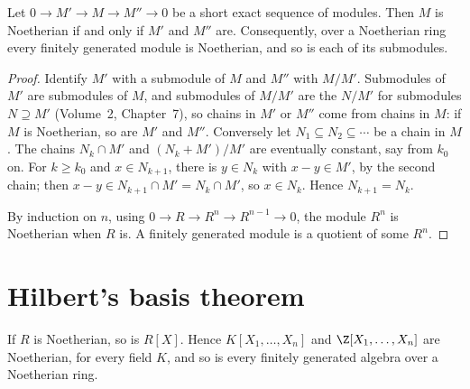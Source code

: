 \begin{proposition}\label{prop:noethmodules}
Let $0\to M'\to M\to M''\to0$ be a short exact sequence of modules. Then $M$ is Noetherian if and only if $M'$ and $M''$ are. Consequently, over a Noetherian ring every finitely generated module is
Noetherian, and so is each of its submodules.
\end{proposition}

\begin{proof}
Identify $M'$ with a submodule of $M$ and $M''$ with $M/M'$. Submodules of $M'$ are submodules of $M$, and submodules of $M/M'$ are the $N/M'$ for submodules $N\supseteq M'$ (Volume~2, Chapter~7), so chains in
$M'$ or $M''$ come from chains in $M$: if $M$ is Noetherian, so are $M'$ and $M''$. Conversely let $N_1\subseteq N_2\subseteq\cdots$ be a chain in $M$. The chains $N_k\cap M'$ and $(N_k+M')/M'$ are eventually constant, say from $k_0$ on. For
$k\ge k_0$ and $x\in N_{k+1}$, there is $y\in N_k$ with $x-y\in M'$, by the second chain; then $x-y\in N_{k+1}\cap M'=N_k\cap M'$, so $x\in N_k$. Hence $N_{k+1}=N_k$.

By induction on $n$, using $0\to R\to R^n\to R^{n-1}\to0$, the module $R^n$ is Noetherian when $R$ is. A finitely generated module is a quotient of some $R^n$.
\end{proof}

\section{Hilbert's basis theorem}

\begin{theorem}\label{thm:hilbertbasis}
If $R$ is Noetherian, so is $R[X]$. Hence $K[X_1,\dots,X_n]$ and $\Z[X_1,\dots,X_n]$ are Noetherian, for every field $K$, and so is every finitely generated algebra over a Noetherian ring.
\end{theorem}


